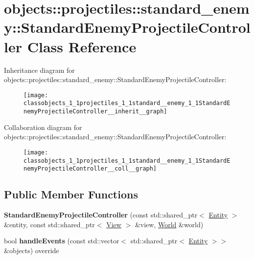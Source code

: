 \hypertarget{classobjects_1_1projectiles_1_1standard__enemy_1_1StandardEnemyProjectileController}{}\section{objects\+:\+:projectiles\+:\+:standard\+\_\+enemy\+:\+:Standard\+Enemy\+Projectile\+Controller Class Reference}
\label{classobjects_1_1projectiles_1_1standard__enemy_1_1StandardEnemyProjectileController}


Inheritance diagram for objects\+:\+:projectiles\+:\+:standard\+\_\+enemy\+:\+:Standard\+Enemy\+Projectile\+Controller\+:\nopagebreak
\begin{figure}[H]
\begin{center}
\leavevmode
\texttt{[image: classobjects\_1\_1projectiles\_1\_1standard\_\_enemy\_1\_1StandardEnemyProjectileController\_\_inherit\_\_graph]}
\end{center}
\end{figure}


Collaboration diagram for objects\+:\+:projectiles\+:\+:standard\+\_\+enemy\+:\+:Standard\+Enemy\+Projectile\+Controller\+:\nopagebreak
\begin{figure}[H]
\begin{center}
\leavevmode
\texttt{[image: classobjects\_1\_1projectiles\_1\_1standard\_\_enemy\_1\_1StandardEnemyProjectileController\_\_coll\_\_graph]}
\end{center}
\end{figure}
\subsection*{Public Member Functions}
\begin{DoxyCompactItemize}
\item 
\mbox{\label{classobjects_1_1projectiles_1_1standard__enemy_1_1StandardEnemyProjectileController_a606a41a83cf137d079d02a1082b3d4e7}}
{\bfseries Standard\+Enemy\+Projectile\+Controller} (const std\+::shared\+\_\+ptr$<$ \hyperlink{classobjects_1_1Entity}{Entity} $>$ \&entity, const std\+::shared\+\_\+ptr$<$ \hyperlink{classobjects_1_1View}{View} $>$ \&view, \hyperlink{classWorld}{World} \&world)
\item 
\mbox{\label{classobjects_1_1projectiles_1_1standard__enemy_1_1StandardEnemyProjectileController_ab462caef5dfc423f8f6fcdb195d59676}}
bool {\bfseries handle\+Events} (const std\+::vector$<$ std\+::shared\+\_\+ptr$<$ \hyperlink{classobjects_1_1Entity}{Entity} $>$$>$ \&objects) override
\end{DoxyCompactItemize}
